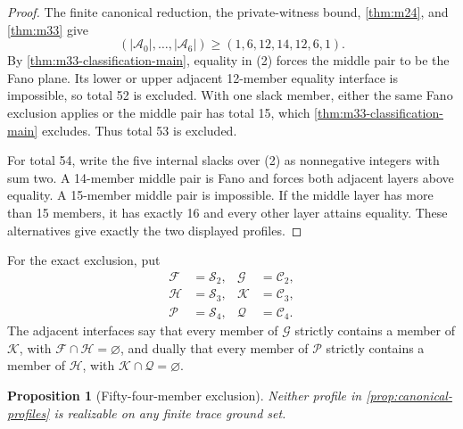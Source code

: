 \documentclass[11pt]{article}
\newtheorem{proposition}[theorem]{Proposition}
\theoremstyle{definition}
\theoremstyle{remark}
\begin{document}
\begin{proof}
The finite canonical reduction, the private-witness bound,
\cref{thm:m24}, and \cref{thm:m33} give
\[
  (|\mathcal A_0|,\ldots,|\mathcal A_6|)
  \geq(1,6,12,14,12,6,1).
  \tag{2}
\]
By \cref{thm:m33-classification-main}, equality in (2) forces the middle pair
to be the Fano plane.  Its lower or upper adjacent 12-member equality
interface is impossible, so total 52 is excluded.  With one slack member,
either the same Fano exclusion applies or the middle pair has total 15,
which \cref{thm:m33-classification-main} excludes.  Thus total 53 is excluded.

For total 54, write the five internal slacks over (2) as nonnegative integers
with sum two.  A 14-member middle pair is Fano and forces both adjacent layers
above equality.  A 15-member middle pair is impossible.  If the middle layer
has more than 15 members, it has exactly 16 and every other layer attains
equality.  These alternatives give exactly the two displayed profiles.
\end{proof}

For the exact exclusion, put
\[
\begin{aligned}
  \mathcal F&=\mathcal S_2,&\mathcal G&=\mathcal C_2,\\
  \mathcal H&=\mathcal S_3,&\mathcal K&=\mathcal C_3,\\
  \mathcal P&=\mathcal S_4,&\mathcal Q&=\mathcal C_4.
\end{aligned}
\]
The adjacent interfaces say that every member of $\mathcal G$ strictly
contains a member of $\mathcal K$, with
$\mathcal F\cap\mathcal H=\varnothing$, and dually that every member of
$\mathcal P$ strictly contains a member of $\mathcal H$, with
$\mathcal K\cap\mathcal Q=\varnothing$.

\begin{proposition}[Fifty-four-member exclusion]
\label{prop:exclude54}
Neither profile in \cref{prop:canonical-profiles} is realizable on any finite
trace ground set.
\end{proposition}
\end{document}

